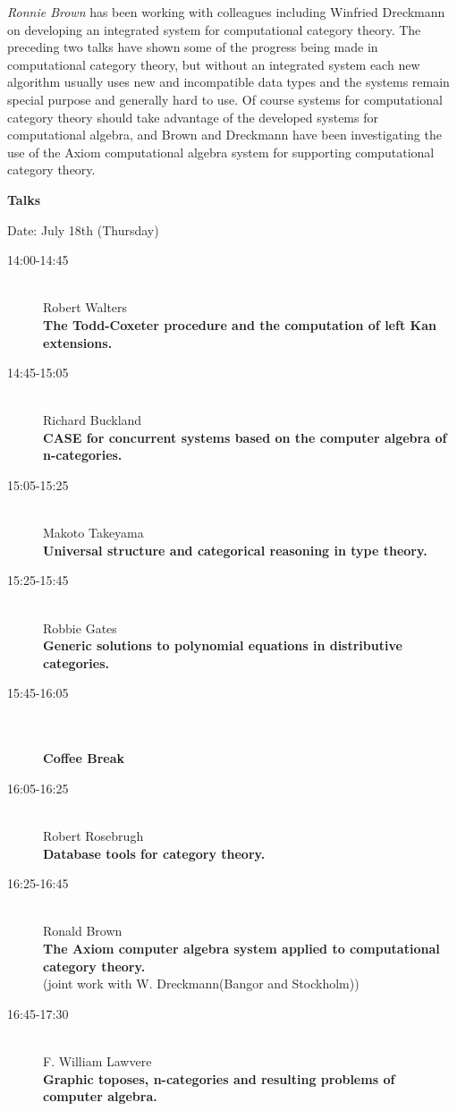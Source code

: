 {\em Ronnie Brown} has been working with colleagues including Winfried Dreckmann on developing an
integrated system for computational category theory. The preceding two talks have shown some of
the progress being made in computational category theory, but without an integrated system each
new algorithm usually uses new and incompatible data types and the systems remain special
purpose and generally hard to use. Of course systems for computational category theory should
take advantage of the developed systems for computational algebra, and Brown and Dreckmann
have been investigating the use of the Axiom computational algebra system for supporting
computational category theory. 

\bigskip
\noindent
{\bf Talks}
\medskip

Date: July 18th (Thursday) 

\begin{description}
\item[14:00-14:45 ] \ \\
  Robert Walters
\\
  {\bf The Todd-Coxeter procedure and the computation of left Kan extensions.} 
\item[14:45-15:05 ] \ \\
  Richard Buckland
\\
  {\bf CASE for concurrent systems based on the computer algebra of n-categories.} 
\item[15:05-15:25] \ \\
  Makoto Takeyama
\\
  {\bf Universal structure and categorical reasoning in type theory.} 
\item[15:25-15:45] \ \\
  Robbie Gates\\
  {\bf Generic solutions to polynomial equations in distributive categories.} 
\item[15:45-16:05 ] \ \\
  \\
  {\bf Coffee Break } 
\item[16:05-16:25] \ \\
  Robert Rosebrugh\\
  {\bf Database tools for category theory.} 
\item[16:25-16:45] \ \\
  Ronald Brown\\
  {\bf The Axiom computer algebra system applied to computational
    category theory.} \\
(joint work with W. Dreckmann(Bangor and Stockholm)) 

\item[16:45-17:30] \ \\
  F. William Lawvere\\
  {\bf Graphic toposes, n-categories and resulting problems of
    computer algebra.} 
\end{description}

